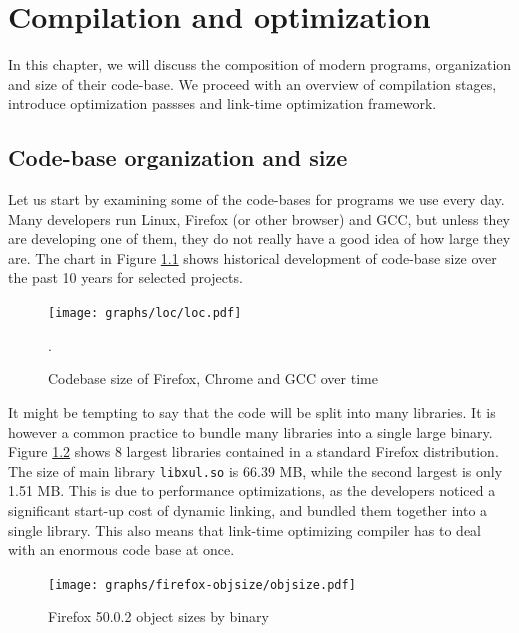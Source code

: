\newcommand{\definice}{\paragraph{Definice.}}

\chapter{Compilation and optimization}

In this chapter, we will discuss the composition of modern
programs, organization and size of their code-base. We proceed with an
overview of compilation stages, introduce optimization passses and link-time
optimization framework.

\section{Code-base organization and size}

Let us start by examining some of the code-bases for programs we use every day.
Many developers run Linux, Firefox (or other browser) and GCC, but
unless they are developing one of them, they do not really have a good idea of how large
they are. The chart in Figure \ref{figure-loc} shows historical development of
code-base size over the past 10 years for selected projects.

\begin{figure}[!ht]
\centering
	\hspace{-1cm}\texttt{[image: graphs/loc/loc.pdf]}
\caption{Codebase size of Firefox, Chrome and GCC over time \cite{openhub}}.
\label{figure-loc}
\end{figure}

It might be tempting to say that the code will be split into many libraries. It
is however a common practice to bundle many libraries into a single large binary.
Figure \ref{figure-firefox-objsize} shows 8 largest libraries contained in a
standard Firefox distribution. The size of main library {\tt libxul.so} is 66.39 MB, while the
second largest is only 1.51 MB. This is due to performance optimizations, as the
developers noticed a significant start-up cost of dynamic linking, and bundled
them together into a single library. This also means that link-time
optimizing compiler has to deal with an enormous code base at once.

\begin{figure}[!ht]
\centering
\texttt{[image: graphs/firefox-objsize/objsize.pdf]}
\caption{Firefox 50.0.2 object sizes by binary}
\label{figure-firefox-objsize}
\end{figure}

